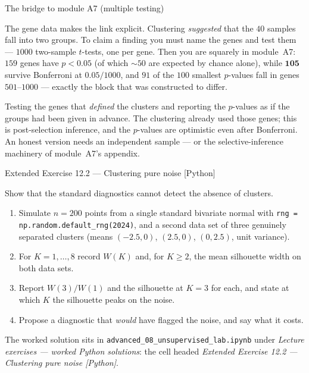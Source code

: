 \documentclass[aspectratio=169,11pt]{beamer}
\begin{document}
\begin{frame}{The bridge to module A7 (multiple testing)}
  \begin{takeaway}
    The gene data makes the link explicit. Clustering \emph{suggested} that the $40$
    samples fall into two groups. To claim a finding you must name the genes and test them
    --- $1000$ two-sample $t$-tests, one per gene. Then you are squarely in module~A7:
    $159$ genes have $p<0.05$ (of which $\sim 50$ are expected by chance alone), while
    $\mathbf{105}$ survive Bonferroni at $0.05/1000$, and $91$ of the $100$ smallest
    $p$-values fall in genes $501$--$1000$ --- exactly the block that was constructed to
    differ.
  \end{takeaway}
  \begin{mistake}
    Testing the genes that \emph{defined} the clusters and reporting the $p$-values as if
    the groups had been given in advance. The clustering already used those genes; this is
    post-selection inference, and the $p$-values are optimistic even after Bonferroni.
    An honest version needs an independent sample --- or the selective-inference machinery
    of module~A7's appendix.
  \end{mistake}
\end{frame}

\begin{frame}{Extended Exercise 12.2 --- Clustering pure noise [Python]}
\begin{longexercise}
  Show that the standard diagnostics cannot detect the absence of clusters.
  \begin{enumerate}
    \item Simulate $n=200$ points from a single standard bivariate normal with
          \texttt{rng = np.random.default\_rng(2024)}, and a second data set of three
          genuinely separated clusters (means $(-2.5,0)$, $(2.5,0)$, $(0,2.5)$, unit
          variance).
    \item For $K=1,\dots,8$ record $W(K)$ and, for $K\ge2$, the mean silhouette width on
          both data sets.
    \item Report $W(3)/W(1)$ and the silhouette at $K=3$ for each, and state at which $K$
          the silhouette peaks on the noise.
    \item Propose a diagnostic that \emph{would} have flagged the noise, and say what it
          costs.
  \end{enumerate}
\end{longexercise}
\begin{labnote}
  The worked solution sits in \texttt{advanced\_08\_unsupervised\_lab.ipynb} under
  \emph{Lecture exercises --- worked Python solutions}: the cell headed
  \emph{Extended Exercise 12.2 --- Clustering pure noise [Python]}.
\end{labnote}
\end{frame}
\end{document}
